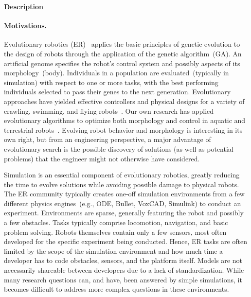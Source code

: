 \vspace{0.2in}
\begin{center}
{\bf \large Description}
\end{center}

\paragraph{Motivations.} 
Evolutionary robotics (ER)~\cite{Floreano2008} applies the basic principles of genetic evolution to the design of robots through the application of the genetic algorithm~(GA).
%
An artificial genome specifies the robot's control system and possibly aspects of its morphology~(body).
%
Individuals in a population are evaluated~(typically in simulation) with respect to one or more tasks, with the best performing individuals selected to pass their genes to the next generation.
%
Evolutionary approaches have yielded effective controllers and physical designs for a variety of crawling, swimming, and flying robots~\cite{bongard-lipson, Lipson2000}.  
%
Our own research has applied evolutionary algorithms to optimize both morphology and control
in aquatic and terrestrial robots~\cite{Clark.JournalBB.2015,MooreALIFEJournal}.  
%
Evolving robot behavior and morphology is interesting in its own right, but from an
engineering perspective, a major advantage of evolutionary search is the possible discovery of solutions (as well as potential problems) that the engineer might not otherwise have considered.

Simulation is an essential component of evolutionary robotics, greatly reducing the time to evolve solutions while avoiding possible damage to physical robots.
%
The ER community typically creates one-off simulation environments from a few different physics 
engines~(e.g., ODE, Bullet, VoxCAD, Simulink) to conduct an experiment.  
%
Environments are sparse, generally featuring the robot and possibly a few obstacles.  
%
Tasks typically comprise locomotion, navigation, and basic problem solving.
%
Robots themselves contain only a few sensors, most often developed for the specific 
experiment being conducted.  
%
Hence, ER tasks are often limited by the scope of the simulation environment and how much time a developer has to code obstacles, sensors, and the platform itself.  
%
Models are not necessarily shareable between developers due to a lack of standardization.  
%
While many research questions can, and have, been answered by simple simulations, 
it becomes difficult to address more complex questions in these environments.  

